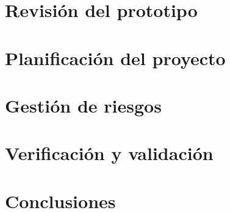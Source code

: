 \documentclass[conference, onecolumn]{IEEEtran}
\begin{document}








\newpage

\section{Revisión del prototipo}





\newpage

\section{Planificación del proyecto}






\newpage

\section{Gestión de riesgos}







\newpage

\section{Verificación y validación}





\newpage

\section{Conclusiones}



\newpage






\end{document}
